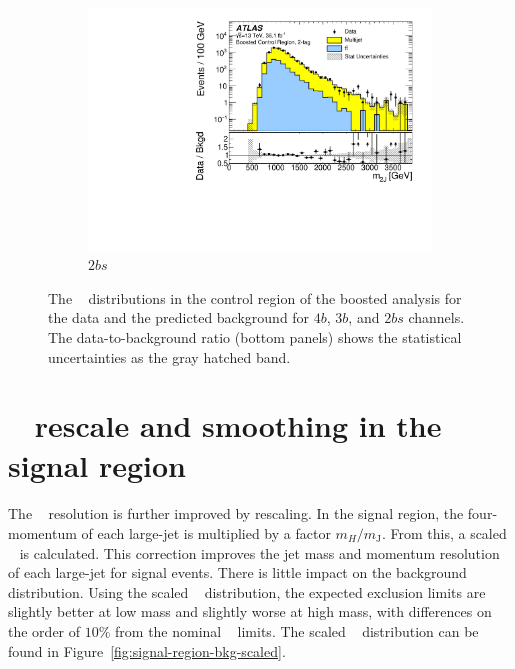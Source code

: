 \begin{figure}[htb!]
    \\
    \begin{subfigure}[b]{0.35\textwidth}
        \includegraphics[width=\textwidth,angle=-90]{figures/boosted/Paperplot/Moriond_bkg_9_TwoTag_split_Control_mHH_l_1.pdf}
        \caption{$2bs$}
        \label{fig:boosted-cr-mjj-2bs}
    \end{subfigure}
   \caption{The \mtwoJ~ distributions in the control region of the boosted analysis for the data and the predicted background for $4b$, $3b$, and $2bs$ channels. The data-to-background ratio (bottom panels) shows the statistical uncertainties as the gray hatched band.}
  \label{fig:boosted-cr-mjj}
\end{figure}


\section{\mtwoJ~ rescale and smoothing in the signal region}
\label{sec:boosted-SR-smoothing}

\paragraph{}
The \mtwoJ~ resolution is further improved by rescaling.
In the signal region, the four-momentum of each large-\R jet is multiplied by a factor $m_{H}/m_{\mathrm{J}}$.
From this, a scaled \mtwoJ~ is calculated.
This correction improves the jet mass and momentum resolution of each large-\R jet for signal events.
There is little impact on the background distribution.
Using the scaled \mtwoJ~ distribution, the expected exclusion limits are slightly better at low mass and slightly worse at high mass, with differences on the order of $10\%$ from the nominal \mtwoJ~ limits.
The scaled \mtwoJ~ distribution can be found in Figure~\ref{fig:signal-region-bkg-scaled}.

